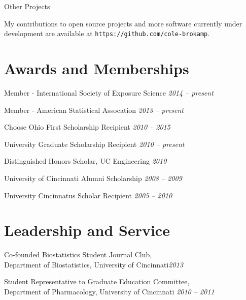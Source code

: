 \documentclass[margin,line]{res}
\newenvironment{list1}{
  \begin{list}{\ding{113}}{%
      \setlength{\itemsep}{0in}
      \setlength{\parsep}{0in} \setlength{\parskip}{0in}
      \setlength{\topsep}{0in} \setlength{\partopsep}{0in} 
      \setlength{\leftmargin}{0.17in}}}{\end{list}}
\newenvironment{list3}{
  \begin{list}{}{%
      \setlength{\itemsep}{0in}
      \setlength{\parsep}{0in} \setlength{\parskip}{0in}
      \setlength{\topsep}{0in} \setlength{\partopsep}{0in} 
      \setlength{\leftmargin}{0in}}}{\end{list}}
\begin{document}
\begin{resume}
Other Projects
\begin{list1} \itemsep 2pt
\item[] My contributions to open source projects and more software currently under development are available at \texttt{https://github.com/cole-brokamp}.
\end{list1}

 

\section{\sc Awards and Memberships} 

\begin{list3} \itemsep 4pt    
\item[] Member - International Society of Exposure Science \hfill \textit{2014 -- present}
\item[] Member - American Statistical Assocation \hfill \textit{2013 -- present}
\item[] Choose Ohio First Scholarship Recipient \hfill \textit{2010 -- 2015}
\item[] University Graduate Scholarship Recipient \hfill \textit{2010 -- present}
\item[] Distinguished Honors Scholar, UC Engineering \hfill \textit{2010}
\item[] University of Cincinnati Alumni Scholarship \hfill \textit{2008 -- 2009}
\item[] University Cincinnatus Scholar Recipient \hfill \textit{2005 -- 2010}
\end{list3}


\section{\sc Leadership and Service} 
\begin{list3} \itemsep 4pt     
\item[] Co-founded Biostatistics Student Journal Club, \\Department of Biostatistics, University of Cincinnati\hfill \textit{2013} 
\item[] Student Representative to Graduate Education Committee, \\Department of Pharmacology, University of Cincinnati \hfill \textit{2010 -- 2011}
\end{list3}


\end{resume}
\end{document}
